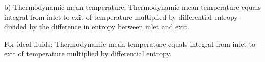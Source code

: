 b) Thermodynamic mean temperature:  
Thermodynamic mean temperature equals integral from inlet to exit of temperature multiplied by differential entropy divided by the difference in entropy between inlet and exit.  

For ideal fluids:  
Thermodynamic mean temperature equals integral from inlet to exit of temperature multiplied by differential entropy.